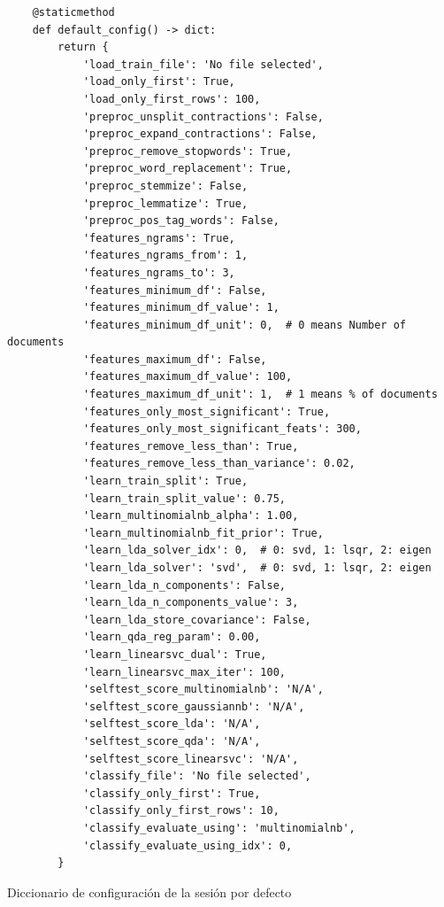 \begin{listing}[H]
\begin{verbatim}
    @staticmethod
    def default_config() -> dict:
        return {
            'load_train_file': 'No file selected',
            'load_only_first': True,
            'load_only_first_rows': 100,
            'preproc_unsplit_contractions': False,
            'preproc_expand_contractions': False,
            'preproc_remove_stopwords': True,
            'preproc_word_replacement': True,
            'preproc_stemmize': False,
            'preproc_lemmatize': True,
            'preproc_pos_tag_words': False,
            'features_ngrams': True,
            'features_ngrams_from': 1,
            'features_ngrams_to': 3,
            'features_minimum_df': False,
            'features_minimum_df_value': 1,
            'features_minimum_df_unit': 0,  # 0 means Number of documents
            'features_maximum_df': False,
            'features_maximum_df_value': 100,
            'features_maximum_df_unit': 1,  # 1 means % of documents
            'features_only_most_significant': True,
            'features_only_most_significant_feats': 300,
            'features_remove_less_than': True,
            'features_remove_less_than_variance': 0.02,
            'learn_train_split': True,
            'learn_train_split_value': 0.75,
            'learn_multinomialnb_alpha': 1.00,
            'learn_multinomialnb_fit_prior': True,
            'learn_lda_solver_idx': 0,  # 0: svd, 1: lsqr, 2: eigen
            'learn_lda_solver': 'svd',  # 0: svd, 1: lsqr, 2: eigen
            'learn_lda_n_components': False,
            'learn_lda_n_components_value': 3,
            'learn_lda_store_covariance': False,
            'learn_qda_reg_param': 0.00,
            'learn_linearsvc_dual': True,
            'learn_linearsvc_max_iter': 100,
            'selftest_score_multinomialnb': 'N/A',
            'selftest_score_gaussiannb': 'N/A',
            'selftest_score_lda': 'N/A',
            'selftest_score_qda': 'N/A',
            'selftest_score_linearsvc': 'N/A',
            'classify_file': 'No file selected',
            'classify_only_first': True,
            'classify_only_first_rows': 10,
            'classify_evaluate_using': 'multinomialnb',
            'classify_evaluate_using_idx': 0,
        }
\end{verbatim}
\caption{Diccionario de configuración de la sesión por defecto}
\label{lst:default-dict}
\end{listing}

\FloatBarrier
\subsection{}

\subsection{}

